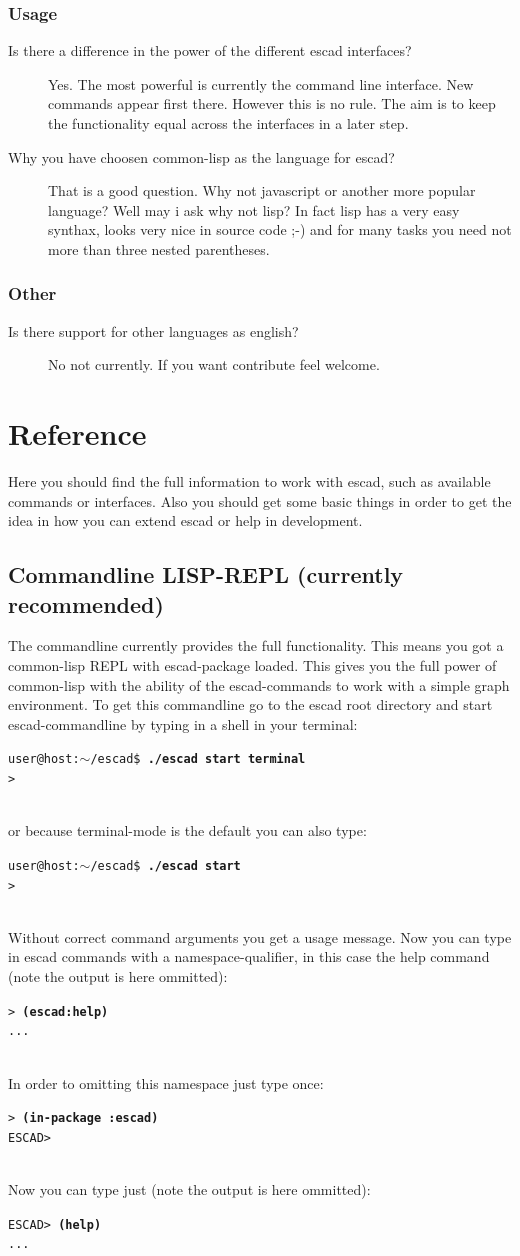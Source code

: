 \documentclass[a4paper, 12pt, openany]{scrbook}
\makeatletter
\newcommand{\shellcmdline}[2]{\\
  \setlength{\fboxsep}{2pt}\colorbox{black!20}{\parbox{\textwidth}{\texttt{user@host:$\sim$/escad\$ \textbf{#1}\\#2}}}\\}
\newcommand{\escadcmdline}[2]{\\\setlength{\fboxsep}{2pt}\colorbox{black!20}{\parbox{\textwidth}{\texttt{ESCAD> \textbf{#1}\\#2}}}\\}
\newcommand{\lispcmdline}[2]{\\\setlength{\fboxsep}{2pt}\colorbox{black!20}{\parbox{\textwidth}{\texttt{> \textbf{#1}\\#2}}}\\}
\makeatother
\begin{document}
\subsection{Usage}
\begin{description}
\item[Is there a difference in the power of the different escad interfaces?] Yes. The most powerful is currently the command line interface. New commands appear first there. However this is no rule. The aim is to keep the functionality equal across the interfaces in a later step.
\item[Why you have choosen common-lisp as the language for escad?] That is a good question. Why not javascript or another more popular language? Well may i ask why not lisp? In fact lisp has a very easy synthax, looks very nice in source code ;-) and for many tasks you need not more than three nested parentheses.
\end{description}
\subsection{Other}
\begin{description}
\item[Is there support for other languages as english?]  No not currently. If you want contribute feel welcome.
\end{description}
\chapter{Reference}
Here you should find the full information to work with escad, such as available commands or interfaces. Also you should get some basic things in order to get the idea in how you can extend escad or help in development.
\section{Commandline LISP-REPL (currently recommended)}\label{sec:cmd_line}
The commandline currently provides the full functionality. This means you got a common-lisp REPL with escad-package loaded. This gives you the full power of common-lisp with the ability of the escad-commands to work with a simple graph environment. To get this commandline go to the escad root directory and start escad-commandline by typing in a shell in your terminal:
\shellcmdline{./escad start terminal}{>}
or because terminal-mode is the default you can also type:
\shellcmdline{./escad start}{>}
Without correct command arguments you get a usage message.
Now you can type in escad commands with a namespace-qualifier, in this case the help command (note the output is here ommitted):
\lispcmdline{(escad:help)}{...}
In order to omitting this namespace just type once:
\lispcmdline{(in-package :escad)}{ESCAD>}
Now you can type just (note the output is here ommitted):
\escadcmdline{(help)}{...}
\end{document}
